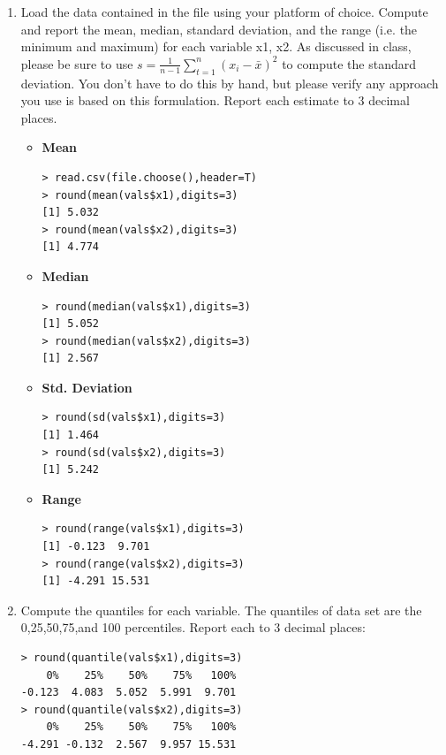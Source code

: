 \documentclass[fontsize=10pt]{scrartcl}
\begin{document}
	\begin{enumerate}
		\item
		Load the data contained in the file using your platform of choice. Compute and report the mean, median, standard deviation, and the range (i.e. the minimum and maximum) for each variable x1, x2. As discussed in class, please be sure to use $s = \frac{1}{n-1} \sum_{t=1}^{n} (x_i - \bar{x})^2$ to compute the standard deviation. You don’t have to do this by hand, but please verify any approach you use is based on this formulation. Report each estimate to 3 decimal places.
		\begin{itemize}
			
			\item
			\textbf{\large Mean} \\
\begin{verbatim}
> read.csv(file.choose(),header=T)
> round(mean(vals$x1),digits=3)
[1] 5.032
> round(mean(vals$x2),digits=3)
[1] 4.774
\end{verbatim}

			\item
			\textbf{\large Median} \\
\begin{verbatim}
> round(median(vals$x1),digits=3)
[1] 5.052
> round(median(vals$x2),digits=3)
[1] 2.567
\end{verbatim}

			\item
			\textbf{\large Std. Deviation} \\
\begin{verbatim}
> round(sd(vals$x1),digits=3)
[1] 1.464
> round(sd(vals$x2),digits=3)
[1] 5.242
\end{verbatim}

			\item
			\textbf{\large Range} \\
\begin{verbatim}
> round(range(vals$x1),digits=3)
[1] -0.123  9.701
> round(range(vals$x2),digits=3)
[1] -4.291 15.531
\end{verbatim}

		\end{itemize}

		\item
		Compute the quantiles for each variable. The quantiles of data set are the 0,25,50,75,and 100 percentiles. Report each to 3 decimal places: \\
\begin{verbatim}
> round(quantile(vals$x1),digits=3)
    0%    25%    50%    75%   100% 
-0.123  4.083  5.052  5.991  9.701 
> round(quantile(vals$x2),digits=3)
    0%    25%    50%    75%   100% 
-4.291 -0.132  2.567  9.957 15.531 
\end{verbatim}
		

\end{enumerate}
\end{document}
